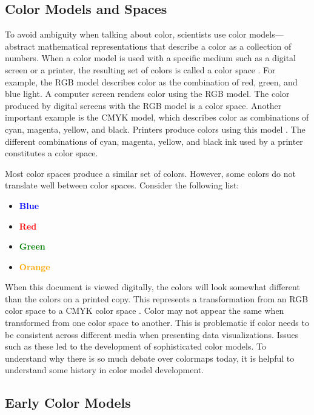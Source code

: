 \documentclass[journal,12pt]{IEEEtran}
\begin{document}
\subsection{Color Models and Spaces}

To avoid ambiguity when talking about color, scientists use
color models---abstract mathematical representations that
describe a color as a collection of numbers.
When a color model is used with a specific medium such as a digital screen or a printer, the resulting set
of colors is called a color space \cite{colorimetry}. For example, the RGB model
describes color as the combination of red, green, and
blue light. A computer screen renders color using the
RGB model. The color produced by digital screens
with the RGB model is a color space. Another important example is the
CMYK model, which describes color as combinations of
cyan, magenta, yellow, and black. Printers produce colors using this model
\cite{colormapping}. The different combinations of cyan, magenta, yellow, and black
ink used by a printer constitutes a color space.

Most color spaces produce a similar set of colors. However, some colors
do not translate well between color spaces. Consider the following list:
\begin{itemize}
\item \textcolor{blue}{\textbf{Blue}}
\item \textcolor{red}{\textbf{Red}}
\item \textcolor{green}{\textbf{Green}}
\item \textcolor{orange}{\textbf{Orange}}
\end{itemize}
When this document is viewed digitally, the colors will look somewhat
different than the colors on a printed copy. This represents
a transformation from an RGB color space to a CMYK color space \cite{colorvblackwhite}.
Color may not appear the same when transformed from one color space to another.
This is problematic if color needs to be consistent across
different media when presenting data visualizations. Issues such as these led
to the development of sophisticated color models. To understand why there is so much debate
over colormaps today, it is helpful to understand some history in color model development.

\subsection{Early Color Models}
\end{document}

